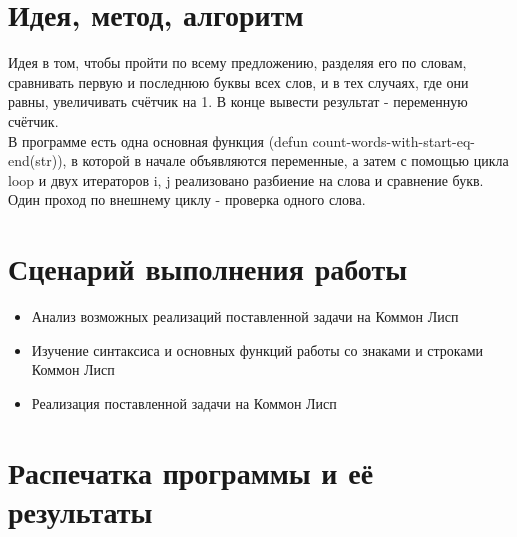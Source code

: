 \documentclass[12pt]{article}
\begin{document}
\section{Идея, метод, алгоритм}
Идея в том, чтобы пройти по всему предложению, разделяя его по словам, сравнивать первую и последнюю буквы всех слов, и в тех случаях, где они равны, увеличивать счётчик на 1. В конце вывести результат - переменную счётчик.
\\
В программе есть одна основная функция (defun count-words-with-start-eq-end(str)), в которой в начале объявляются переменные, а затем с помощью цикла loop и двух итераторов i, j реализовано разбиение на слова и сравнение букв. Один проход по внешнему циклу - проверка одного слова.  

\section{Сценарий выполнения работы}
\begin{itemize}
\setlength{\itemsep}{-1mm}
\item Анализ возможных реализаций поставленной задачи на Коммон Лисп
\item Изучение синтаксиса и основных функций работы со знаками и строками Коммон Лисп
\item Реализация поставленной задачи на Коммон Лисп
\end{itemize}
\section{Распечатка программы и её результаты}
\end{document}
